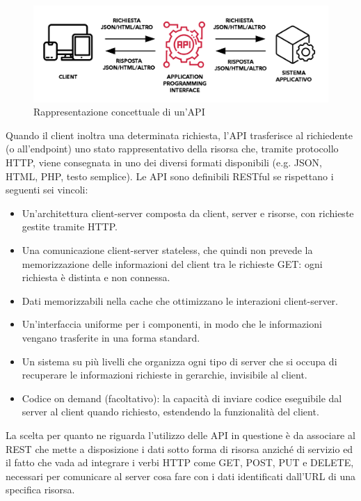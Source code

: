 \begin{figure}[ht!]
    \centering
    \includegraphics[width=150mm]{images/API.png}
    \caption{Rappresentazione concettuale di un'API\label{overflow}}
\end{figure}

Quando il client inoltra una determinata richiesta, l'API trasferisce al richiedente (o all'endpoint) uno stato rappresentativo della risorsa che, tramite protocollo HTTP, viene consegnata in uno dei diversi formati disponibili (e.g. JSON, HTML, PHP, testo semplice).
\clearpage
Le API sono definibili RESTful se rispettano i seguenti sei vincoli:
\begin{itemize}
    \item Un'architettura client-server composta da client, server e risorse, con richieste gestite tramite HTTP.
    \item Una comunicazione client-server stateless, che quindi non prevede la memorizzazione delle informazioni del client tra le richieste GET: ogni richiesta è distinta e non connessa.
    \item Dati memorizzabili nella cache che ottimizzano le interazioni client-server.
    \item Un'interfaccia uniforme per i componenti, in modo che le informazioni vengano trasferite in una forma standard.
    \item Un sistema su più livelli che organizza ogni tipo di server che si occupa di recuperare le informazioni richieste in gerarchie, invisibile al client.
    \item Codice on demand (facoltativo): la capacità di inviare codice eseguibile dal server al client quando richiesto, estendendo la funzionalità del client.
\end{itemize}

La scelta per quanto ne riguarda l'utilizzo delle API in questione è da associare al REST che mette a disposizione i dati sotto forma di risorsa anziché di servizio ed il fatto che vada ad integrare i verbi HTTP come GET, POST, PUT e DELETE, necessari per comunicare al server cosa fare con i dati identificati dall'URL di una specifica risorsa.
\clearpage

